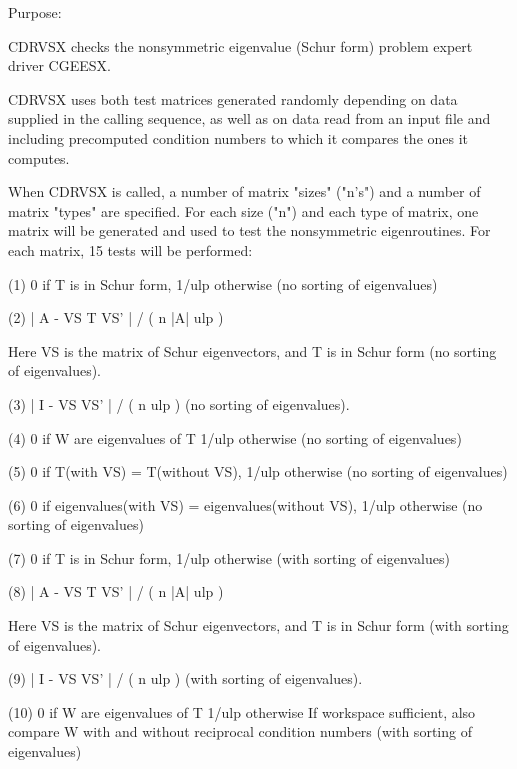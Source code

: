 \begin{DoxyParagraph}{Purpose\+: }
\begin{DoxyVerb}    CDRVSX checks the nonsymmetric eigenvalue (Schur form) problem
    expert driver CGEESX.

    CDRVSX uses both test matrices generated randomly depending on
    data supplied in the calling sequence, as well as on data
    read from an input file and including precomputed condition
    numbers to which it compares the ones it computes.

    When CDRVSX is called, a number of matrix "sizes" ("n's") and a
    number of matrix "types" are specified.  For each size ("n")
    and each type of matrix, one matrix will be generated and used
    to test the nonsymmetric eigenroutines.  For each matrix, 15
    tests will be performed:

    (1)     0 if T is in Schur form, 1/ulp otherwise
           (no sorting of eigenvalues)

    (2)     | A - VS T VS' | / ( n |A| ulp )

      Here VS is the matrix of Schur eigenvectors, and T is in Schur
      form  (no sorting of eigenvalues).

    (3)     | I - VS VS' | / ( n ulp ) (no sorting of eigenvalues).

    (4)     0     if W are eigenvalues of T
            1/ulp otherwise
            (no sorting of eigenvalues)

    (5)     0     if T(with VS) = T(without VS),
            1/ulp otherwise
            (no sorting of eigenvalues)

    (6)     0     if eigenvalues(with VS) = eigenvalues(without VS),
            1/ulp otherwise
            (no sorting of eigenvalues)

    (7)     0 if T is in Schur form, 1/ulp otherwise
            (with sorting of eigenvalues)

    (8)     | A - VS T VS' | / ( n |A| ulp )

      Here VS is the matrix of Schur eigenvectors, and T is in Schur
      form  (with sorting of eigenvalues).

    (9)     | I - VS VS' | / ( n ulp ) (with sorting of eigenvalues).

    (10)    0     if W are eigenvalues of T
            1/ulp otherwise
            If workspace sufficient, also compare W with and
            without reciprocal condition numbers
            (with sorting of eigenvalues)


\end{DoxyVerb}
\end{DoxyParagraph}

